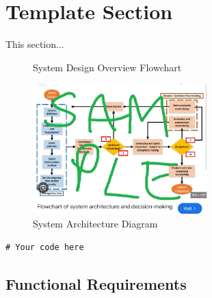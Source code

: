 \section{Template Section}
This section...

\begin{figure}[H]
    \centering
    \scalebox{0.8}{ %
        
    }
    \caption{System Design Overview Flowchart}
    \label{fig:decriptiveLabel44} %
\end{figure}

\begin{figure}[htbp] %
    \centering
    \includegraphics[width=0.6\textwidth]{figures/methodology/system_architecture.jpg} %
    \caption{System Architecture Diagram}       %
    \label{fig:example_unique_label}            %
\end{figure}                             %

\begin{lstlisting}[style=cstyle, caption=Relevant Caption, label=lst:unique_label]
    # Your code here
    \end{lstlisting}    

\subsection{Functional Requirements}

